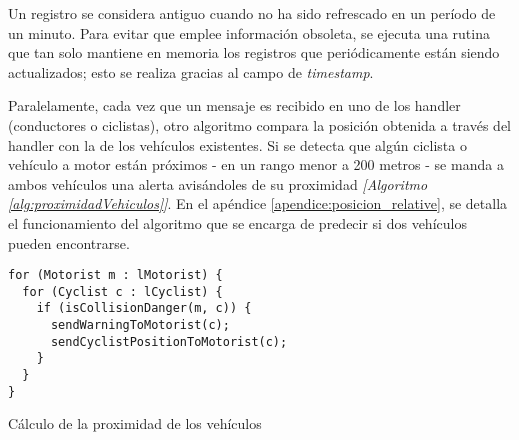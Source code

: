 Un registro se considera antiguo cuando no ha sido refrescado en un período de un
minuto. Para evitar que emplee información obsoleta, se ejecuta una rutina que tan
solo mantiene en memoria los registros que periódicamente están siendo actualizados;
esto se realiza gracias al campo de \emph{timestamp}.

Paralelamente, cada vez que un mensaje es recibido en uno de los handler (conductores o
ciclistas), otro algoritmo compara la posición obtenida a través del handler con la de los
vehículos existentes. Si se detecta que algún ciclista o vehículo a motor están próximos 
- en un rango menor a 200 metros - se manda a ambos vehículos una alerta avisándoles de 
su proximidad \emph{[Algoritmo \ref{alg:proximidadVehiculos}]}. En el apéndice
\ref{apendice:posicion_relative}, se detalla el funcionamiento del algoritmo que se encarga
de predecir si dos vehículos pueden encontrarse.

\begin{listing}
	\begin{minipage}{.4\textwidth}
		\begin{verbatim}
for (Motorist m : lMotorist) {
  for (Cyclist c : lCyclist) {
    if (isCollisionDanger(m, c)) {
      sendWarningToMotorist(c);
      sendCyclistPositionToMotorist(c);
    }
  }
}
		\end{verbatim}
	\end{minipage}
	\caption{Cálculo de la proximidad de los vehículos}\label{alg:proximidadVehiculos}
\end{listing}

